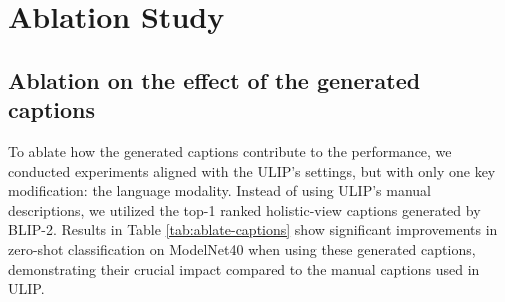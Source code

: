 \documentclass[10pt,twocolumn,letterpaper]{article}
\newcommand{\ning}[1]{\textcolor{blue}{Ning: #1}}
\begin{document}



\vspace{-6mm}
\section{Ablation Study}

\subsection{Ablation on the effect of the generated captions}
\label{sec:ablate_captions}
To ablate how the generated captions contribute to the performance, we conducted experiments aligned with the ULIP's settings, but with only one key modification: the language modality. Instead of using ULIP's manual descriptions, we utilized the top-1 ranked holistic-view captions generated by BLIP-2. Results in Table \ref{tab:ablate-captions} show significant improvements in zero-shot classification on ModelNet40 when using these generated captions, demonstrating their crucial impact compared to the manual captions used in ULIP.
\end{document}
